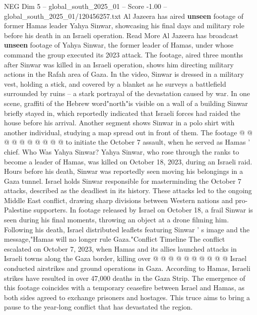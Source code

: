 \begin{textsample}{NEG Dim 5 – global\_south\_2025\_01 – Score -1.00 – global\_south\_2025\_01/120456257.txt}  \label{ex:f5_neg_102}
Al Jazeera has aired \textbf{unseen} footage of former Hamas leader Yahya Sinwar, showcasing his final days and military role before his death in an Israeli operation.
Read More Al Jazeera has broadcast \textbf{unseen} footage of Yahya Sinwar, the former leader of Hamas, under whose command the group executed its 2023 attack.
The footage, aired three months after Sinwar was killed in an Israeli operation, shows him directing military actions in the Rafah area of Gaza.
In the video, Sinwar is dressed in a military vest, holding a stick, and covered by a blanket as he surveys a battlefield surrounded by ruins -- a stark portrayal of the devastation caused by war.
In one scene, graffiti of the Hebrew word"north"is visible on a wall of a building Sinwar briefly stayed in, which reportedly indicated that Israeli forces had raided the house before his arrival.
Another segment shows Sinwar in a polo shirt with another individual, studying a map spread out in front of them.
The footage @ @ @ @ @ @ @ @ @ @ to initiate the October 7 assault, when he served as Hamas ' chief.
Who Was Yahya Sinwar?
Yahya Sinwar, who rose through the ranks to become a leader of Hamas, was killed on October 18, 2023, during an Israeli raid.
Hours before his death, Sinwar was reportedly seen moving his belongings in a Gaza tunnel.
Israel holds Sinwar responsible for masterminding the October 7 attacks, described as the deadliest in its history.
These attacks led to the ongoing Middle East conflict, drawing sharp divisions between Western nations and pro-Palestine supporters.
In footage released by Israel on October 18, a frail Sinwar is seen during his final moments, throwing an object at a drone filming him.
Following his death, Israel distributed leaflets featuring Sinwar ' s image and the message,"Hamas will no longer rule Gaza."Conflict Timeline The conflict escalated on October 7, 2023, when Hamas and its allies launched attacks in Israeli towns along the Gaza border, killing over @ @ @ @ @ @ @ @ @ @ Israel conducted airstrikes and ground operations in Gaza.
According to Hamas, Israeli strikes have resulted in over 47,000 deaths in the Gaza Strip.
The emergence of this footage coincides with a temporary ceasefire between Israel and Hamas, as both sides agreed to exchange prisoners and hostages.
This truce aims to bring a pause to the year-long conflict that has devastated the region.

\end{textsample}
